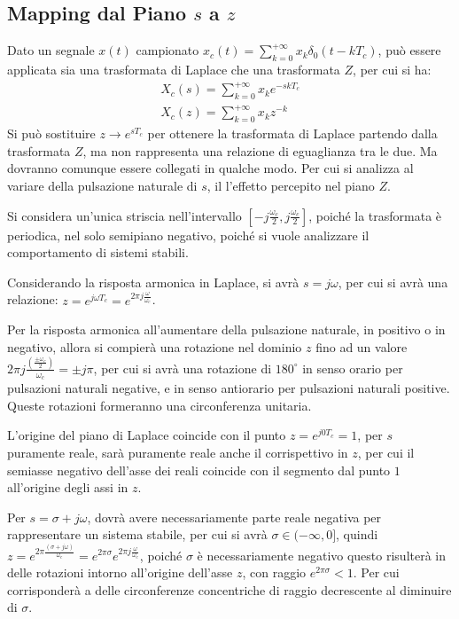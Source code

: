 \documentclass{article}
\numberwithin{equation}{subsection}
\begin{document}
\subsection{Mapping dal Piano $s$ a $z$}

Dato un segnale $x(t)$ campionato $x_c(t)=\displaystyle\sum_{k=0}^{+\infty}x_k\delta_0(t-kT_c)$, può essere applicata sia una trasformata di Laplace che una trasformata $Z$, per 
cui si ha:
\begin{gather}
    X_c(s)=\sum_{k=0}^{+\infty}x_ke^{-skT_c}\\
    X_c(z)=\sum_{k=0}^{+\infty}x_kz^{-k}
\end{gather}
Si può sostituire $z\to e^{sT_c}$ per ottenere la trasformata di Laplace partendo dalla trasformata $Z$, ma non rappresenta una relazione di eguaglianza tra le due. 
Ma dovranno comunque essere collegati in qualche modo. Per cui si analizza al variare della pulsazione naturale di $s$, il l'effetto percepito nel piano $Z$. 

Si considera un'unica striscia nell'intervallo $\left[\displaystyle-j\frac{\omega_c}{2},j\frac{\omega_c}{2}\right]$, poiché la trasformata è periodica, nel solo semipiano 
negativo, poiché si vuole analizzare il comportamento di sistemi stabili. 

Considerando la risposta armonica in Laplace, si avrà $s=j\omega$, per cui si avrà una relazione: $z=e^{j\omega T_c}=e^{2\pi j\frac{\omega}{\omega_c}}$. 

Per la risposta armonica all'aumentare della pulsazione naturale, in positivo o in negativo, 
allora si compierà una rotazione nel dominio $z$ fino ad un valore $2\pi j\displaystyle\frac{\left(\frac{\pm\omega_c}{2}\right)}{\omega_c}=\pm j\pi$, per cui si avrà una rotazione di 
$180^{\circ}$ in senso orario per pulsazioni naturali negative, e in senso antiorario per pulsazioni naturali positive. Queste rotazioni formeranno una circonferenza 
unitaria. 

L'origine del piano di Laplace coincide con il punto $z=e^{j0T_c}=1$, per $s$ puramente reale, sarà puramente reale anche il corrispettivo in $z$, per cui il semiasse 
negativo dell'asse dei reali coincide con il segmento dal punto $1$ all'origine degli assi in $z$. 

Per $s=\sigma+j\omega$, dovrà avere necessariamente parte reale negativa per rappresentare un sistema stabile, per cui si avrà $\sigma\in(-\infty,0]$, quindi 
$z=e^{2\pi\frac{(\sigma+j\omega)}{\omega_c}}=e^{2\pi\sigma}e^{2\pi j\frac{\omega}{\omega_c}}$, poiché $\sigma$ è necessariamente negativo questo risulterà in 
delle rotazioni intorno all'origine dell'asse $z$, con raggio $e^{2\pi\sigma}<1$. Per cui corrisponderà a delle circonferenze concentriche di raggio decrescente al 
diminuire di $\sigma$. 
\end{document}
